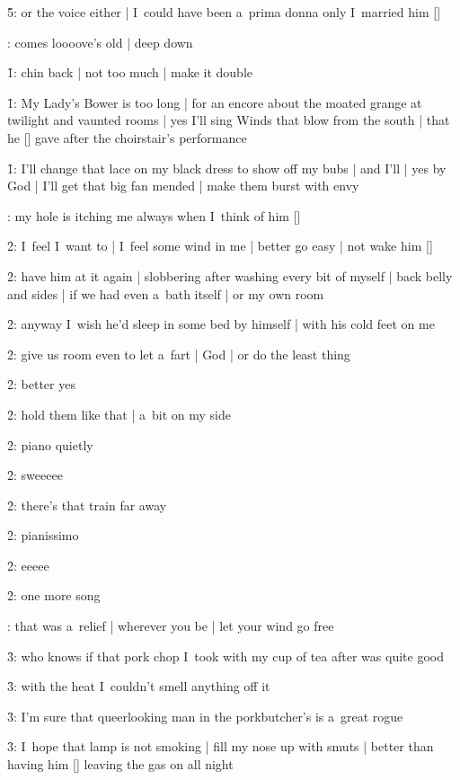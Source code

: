 \f5:
or the voice either |
I~could have been a~prima donna only I~married him [\bloom]

:
comes loooove's old |
deep down

\f1:
chin back |
not too much |
make it double

\f1:
My Lady's Bower is too long |
for an encore about the moated grange at twilight and vaunted rooms |
yes I'll sing Winds that blow from the south |
that he [\dArcy] gave after the choirstair's performance

\f1:
I'll change that lace on my black dress to show off my bubs |
and I'll |
yes by God |
I'll get that big fan mended |
make them burst with envy

:
my hole is itching me always when I~think of him [\boylan]

\f2:
I~feel I~want to |
I~feel some wind in me |
better go easy |
not wake him [\bloom]

\f2:
have him at it again |
slobbering after washing every bit of myself |
back belly and sides |
if we had even a~bath itself |
or my own room

\f2:
anyway I~wish he'd sleep in some bed by himself |
with his cold feet on me

\f2:
give us room even to let a~fart |
God |
or do the least thing

\f2:
better yes

\f2:
hold them like that |
a~bit on my side

\f2:
piano quietly

\f2:
sweeeee

\f2:
there's that train far away

\f2:
pianissimo

\f2:
eeeee

\f2:
one more song





:
that was a~relief |
wherever you be |
let your wind go free

\f3:
who knows if that pork chop I~took with my cup of tea after
was quite good

\f3:
with the heat I~couldn't smell anything off it

\f3:
I'm sure that queerlooking man in the porkbutcher's is a~great rogue

\f3:
I~hope that lamp is not smoking |
fill my nose up with smuts |
better than having him [\bloom] leaving the gas on all night

